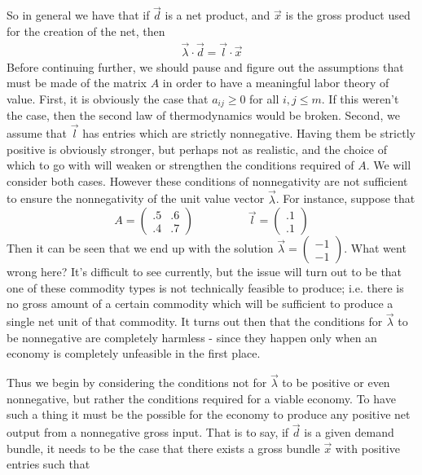 \documentclass{article}
\theoremstyle{definition}
\theoremstyle{plain}
\theoremstyle{theorem}
\begin{document}
So in general we have that if $\vec{d}$ is a net product, and $\vec{x}$ is the gross product used for the creation of the net, then 
\begin{align}
	\vec{\lambda}\cdot \vec{d} = \vec{l} \cdot \vec{x}
\end{align}
Before continuing further, we should pause and figure out the assumptions that must be made of the matrix $A$ in order to have a meaningful labor theory of value. First, it is obviously the case that $a_{ij} \geq 0$ for all $i,j \leq m$. If this weren't the case, then the second law of thermodynamics would be broken. Second, we assume that $\vec{l}$ has entries which are strictly nonnegative. Having them be strictly positive is obviously stronger, but perhaps not as realistic, and the choice of which to go with will weaken or strengthen the conditions required of $A$. We will consider both cases. However these conditions of nonnegativity are not sufficient to ensure the nonnegativity of the unit value vector $\vec{\lambda}$. For instance, suppose that 
\[ A = \begin{pmatrix} .5 & .6 \\ .4 & .7 \end{pmatrix} \hspace{2cm} \vec{l} = \begin{pmatrix} .1 \\ .1 \end{pmatrix} \]
Then it can be seen that we end up with the solution $\vec{\lambda} = \begin{pmatrix} -1 \\ -1 \end{pmatrix}$. What went wrong here? It's difficult to see currently, but the issue will turn out to be that one of these commodity types is not technically feasible to produce; i.e. there is no gross amount of a certain commodity which will be sufficient to produce a single net unit of that commodity. It turns out then that the conditions for $\vec{\lambda}$ to be nonnegative are completely harmless - since they happen only when an economy is completely unfeasible in the first place. \par 
 Thus we begin by considering the conditions not for $\vec{\lambda}$ to be positive or even nonnegative, but rather the conditions required for a viable economy. To have such a thing it must be the possible for the economy to produce any positive net output from a nonnegative gross input. That is to say, if $\vec{d}$ is a given demand bundle, it needs to be the case that there exists a gross bundle $\vec{x}$ with positive entries such that 
\end{document}
